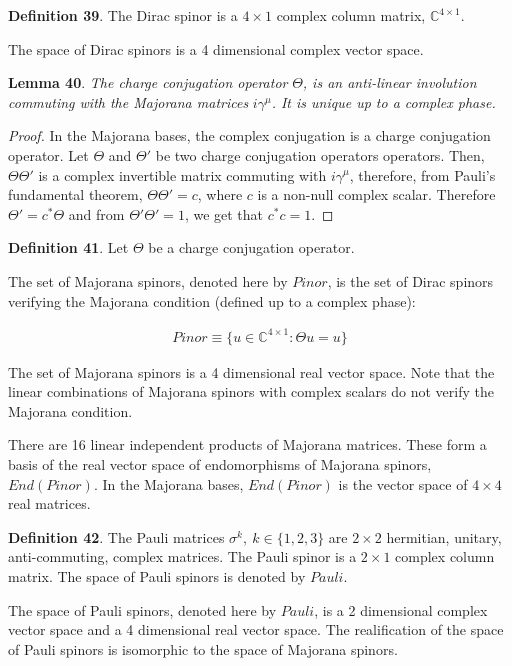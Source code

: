 \documentclass[11pt]{book}
\begin{document}
\textbf{Definition 39}. The Dirac spinor is a \(4\times 1\) complex
column matrix, \(\mathbb{C}^{4\times 1}\).

The space of Dirac spinors is a 4 dimensional complex vector space.

\textbf{Lemma 40}. \emph{The charge conjugation operator
}\(\Theta\)\emph{, is an anti-linear involution commuting with the
Majorana matrices }\(i\gamma^\mu\)\emph{. It is unique up to a complex
phase.}

\emph{Proof.} In the Majorana bases, the complex conjugation is a charge
conjugation operator. Let \(\Theta\) and \(\Theta'\) be two charge
conjugation operators operators. Then, \(\Theta\Theta'\) is a complex
invertible matrix commuting with \(i\gamma^\mu\), therefore, from
Pauli's fundamental theorem, \(\Theta\Theta'=c\), where \(c\) is a
non-null complex scalar. Therefore \(\Theta'=c^*\Theta\) and from
\(\Theta'\Theta'=1\), we get that \(c^* c=1\).~◻

\textbf{Definition 41}. Let \(\Theta\) be a charge conjugation operator.

The set of Majorana spinors, denoted here by \(Pinor\), is the set of
Dirac spinors verifying the Majorana condition (defined up to a complex
phase):

\begin{equation}\begin{aligned}
Pinor\equiv \{u\in \mathbb{C}^{4\times 1}: \Theta u= u\}\end{aligned}\end{equation}

The set of Majorana spinors is a 4 dimensional real vector space. Note
that the linear combinations of Majorana spinors with complex scalars do
not verify the Majorana condition.

There are 16 linear independent products of Majorana matrices. These
form a basis of the real vector space of endomorphisms of Majorana
spinors, \(End(Pinor)\). In the Majorana bases, \(End(Pinor)\) is the
vector space of \(4\times 4\) real matrices.

\textbf{Definition 42}. The Pauli matrices \(\sigma^k,\ k\in\{1,2,3\}\)
are \(2\times 2\) hermitian, unitary, anti-commuting, complex matrices.
The Pauli spinor is a \(2\times 1\) complex column matrix. The space of
Pauli spinors is denoted by \(Pauli\).

The space of Pauli spinors, denoted here by \(Pauli\), is a 2
dimensional complex vector space and a 4 dimensional real vector space.
The realification of the space of Pauli spinors is isomorphic to the
space of Majorana spinors.
\end{document}
